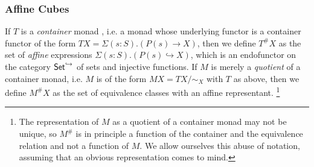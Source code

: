 \documentclass[a4paper]{memoir}
\begin{document}
\subsubsection{Affine Cubes}
If $T$ is a \emph{container} monad \cite{container-combinatorics}, i.e. a monad whose underlying functor is a container functor \cite{containers} of the form $TX = \Sigma(s : S).(P(s) \to X)$, then we define $T^\# X$ as the set of \emph{affine} expressions $\Sigma(s : S).(P(s) \hookrightarrow X)$, which is an endofunctor on the category ${\mathsf{Set}}^{\hookrightarrow}$ of sets and injective functions.
If $M$ is merely a \emph{quotient} of a container monad, i.e. $M$ is of the form $MX = TX/\sim_X$ with $T$ as above, then we define $M^\# X$ as the set of equivalence classes with an affine representant.%
\footnote{The representation of $M$ as a quotient of a container monad may not be unique, so $M^\#$ is in principle a function of the container and the equivalence relation and not a function of $M$. We allow ourselves this abuse of notation, assuming that an obvious representation comes to mind.}
\end{document}
